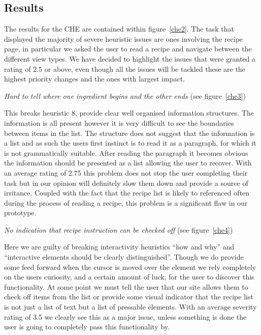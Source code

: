 \subsection{Results}
The results for the CHE are contained within figure~\ref{che2}. The task that displayed the majority of severe heuristic issues are ones involving the recipe page, in particular we asked the user to read a recipe and navigate between the different view types. We have decided to highlight the issues that were granted a rating of 2.5 or above, even though all the issues will be tackled these are the highest priority changes and the ones with largest impact.
\begin{center}
  \emph{Hard to tell where one ingredient begins and the other ends} (see figure~\ref{che3})
\end{center}
This breaks heuristic 8, provide clear well organised information structures. The information is all present however it is very difficult to see the boundaries between items in the list. The structure does not suggest that the information is a list and as such the users first instinct is to read it as a paragraph, for which it is not grammatically suitable. After reading the paragraph it becomes obvious the information should be presented as a list allowing the user to recover. With an average rating of 2.75 this problem does not stop the user completing their task but in our opinion will definitely slow them down and provide a source of irritance. Coupled with the fact that the recipe list is likely to referenced often during the process of reading a recipe, this problem is a significant flaw in our prototype.
\begin{center}
  \emph{No indication that recipe instruction can be checked off} (see figure~\ref{che4})
\end{center}
Here we are guilty of breaking interactivity heuristics “how and why” and “interactive elements should be clearly distinguished”. Though we do provide some feed forward when the cursor is moved over the element we rely completely on the users curiosity, and a certain amount of luck, for the user to discover this functionality. At some point we must tell the user that our site allows them to check off items from the list or provide some visual indicator that the recipe list is not just a list of text but a list of pressable elements. With an average severity rating of 3.5 we clearly see this as a major issue, unless something is done the user is going to completely pass this functionality by.

